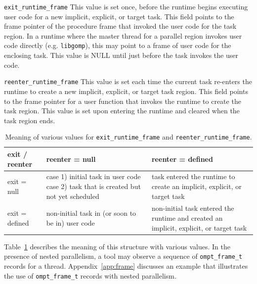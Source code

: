 \documentclass{article}
\begin{document}
\begin{description}
\item \verb|exit_runtime_frame|
     This value is set once, before the runtime begins executing user code for a new implicit, explicit, or target task.   
     This field points to the frame pointer of the procedure frame that invoked the user code for the task region. 
     In a runtime where the master thread for a parallel region invokes user code directly (e.g. \verb|libgomp|), this may point to a frame of user code for the enclosing task.
     This value is NULL until just before the task invokes the user code.
  
\item \verb|reenter_runtime_frame|
     This value is set each time the current task re-enters the 
     runtime to create a new implicit, explicit, or target task region. This field 
     points to the frame pointer for a user function that invokes the runtime to create the task region.  
     This value is set upon entering the runtime and cleared when the task region ends. 

\end{description}



\begin{table}
\begin{center}
\begin{tabular}{|l|p{2in}|p{2in}|}
\hline
exit / reenter 	& reenter = null										& reenter = defined \\\hline\hline
exit = null		& case 1)  initial task in user code case 2) task that is created but not yet scheduled &  task entered the runtime to create an implicit, explicit, or target task \\\hline
exit = defined 	& non-initial task in (or soon to be in) user code							& non-initial task entered the runtime and created an implicit, explicit, or target task\\\hline
\end{tabular}
\end{center}
\caption{Meaning of various values for {\tt exit\_runtime\_frame} and {\tt reenter\_runtime\_frame}.}
\label{tab:frame}
\end{table}

\noindent
Table~\ref{tab:frame} describes the meaning of this structure with various values.
In the presence of nested parallelism, a tool may observe a sequence of \verb|ompt_frame_t| records for a thread. Appendix~\ref{app:frame} discusses  an example that illustrates the use of \verb|ompt_frame_t| records with nested parallelism.
\end{document}
